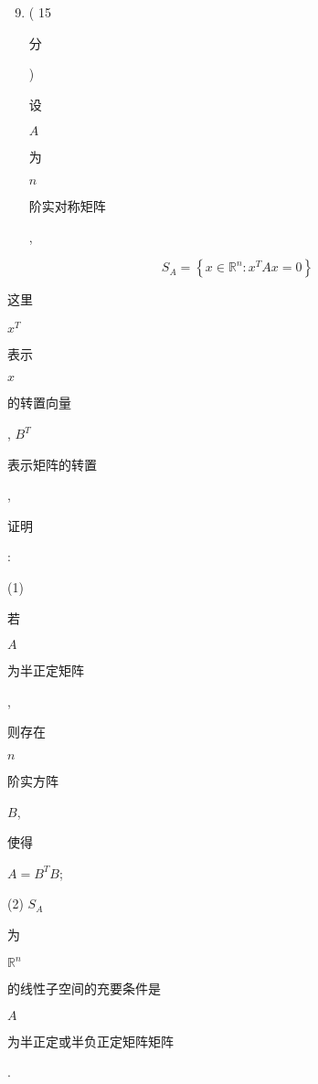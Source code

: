 \documentclass[10pt]{article}
\begin{document}
\begin{enumerate}
  \setcounter{enumi}{8}
  \item ( 15 \begin{CJK}{UTF8}{mj}分\end{CJK}) \begin{CJK}{UTF8}{mj}设\end{CJK} $A$ \begin{CJK}{UTF8}{mj}为\end{CJK} $n$ \begin{CJK}{UTF8}{mj}阶实对称矩阵\end{CJK},
\end{enumerate}
$$
S_{A}=\left\{x \in \mathbb{R}^{n}: x^{T} A x=0\right\}
$$
\begin{CJK}{UTF8}{mj}这里\end{CJK} $x^{T}$ \begin{CJK}{UTF8}{mj}表示\end{CJK} $x$ \begin{CJK}{UTF8}{mj}的转置向量\end{CJK}, $B^{T}$ \begin{CJK}{UTF8}{mj}表示矩阵的转置\end{CJK}, \begin{CJK}{UTF8}{mj}证明\end{CJK}:

(1) \begin{CJK}{UTF8}{mj}若\end{CJK} $A$ \begin{CJK}{UTF8}{mj}为半正定矩阵\end{CJK}, \begin{CJK}{UTF8}{mj}则存在\end{CJK} $n$ \begin{CJK}{UTF8}{mj}阶实方阵\end{CJK} $B$, \begin{CJK}{UTF8}{mj}使得\end{CJK} $A=B^{T} B$;

(2) $S_{A}$ \begin{CJK}{UTF8}{mj}为\end{CJK} $\mathbb{R}^{n}$ \begin{CJK}{UTF8}{mj}的线性子空间的充要条件是\end{CJK} $A$ \begin{CJK}{UTF8}{mj}为半正定或半负正定矩阵矩阵\end{CJK}.
\end{document}
